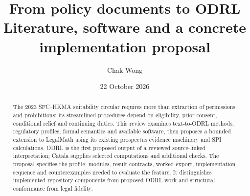 \documentclass[12pt,a4paper]{article}
\title{\sffamily\bfseries\color{navy}From policy documents to ODRL\\[0.5em]\Large Literature, software and a concrete implementation proposal}
\author{Chak Wong}
\date{22 October 2026}
\begin{document}
\raggedbottom
\maketitle
\begin{abstract}
The 2023 SFC--HKMA suitability circular requires more than extraction of
permissions and prohibitions: its streamlined procedures depend on eligibility,
prior consent, conditional relief and continuing duties. This review examines
text-to-ODRL methods, regulatory profiles, formal semantics and available
software, then proposes a bounded extension to LegalMath using its existing
prospectus evidence machinery and SPI calculations. ODRL is the first proposed
output of a reviewed source-linked interpretation; Catala supplies selected
computations and additional checks. The proposal specifies the profile,
modules, result contracts, worked export, implementation sequence and
counterexamples needed to evaluate the feature. It distinguishes implemented
repository components from proposed ODRL work and structural conformance
from legal fidelity.
\end{abstract}
\clearpage
\tableofcontents
\clearpage


\clearpage
\begingroup
\raggedright


\endgroup
\end{document}
